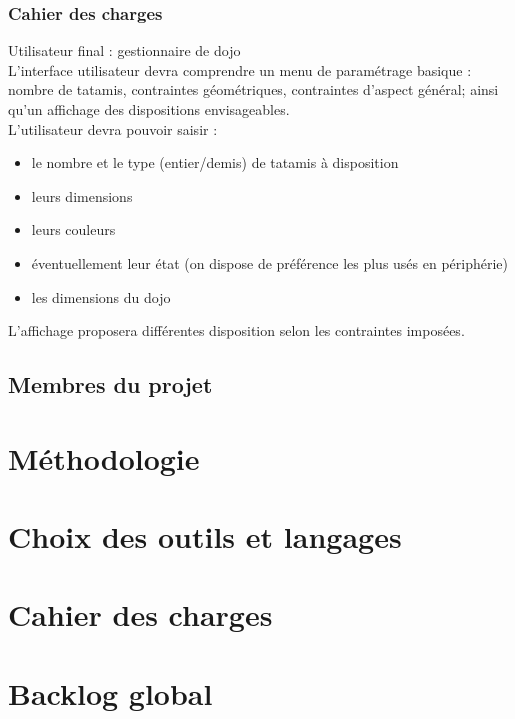 \documentclass{tstextbook}
\begin{document}
  \subsection{Cahier des charges}

    Utilisateur final : gestionnaire de dojo\\

    L'interface utilisateur devra comprendre un menu de paramétrage basique : nombre de tatamis,
    contraintes géométriques, contraintes d'aspect général; ainsi qu'un affichage des dispositions envisageables.\\

    L'utilisateur devra pouvoir saisir :

    \begin{itemize}
        \item le nombre et le type (entier/demis) de tatamis à disposition
        \item leurs dimensions
        \item leurs couleurs
        \item éventuellement leur état (on dispose de préférence les plus usés en périphérie)
        \item les dimensions du dojo
    \end{itemize}

    L'affichage proposera différentes disposition selon les contraintes imposées.

  \section{Membres du projet}

  
\chapter{Méthodologie}


\chapter{Choix des outils et langages}


\chapter{Cahier des charges}


\chapter{Backlog global}

\end{document}

